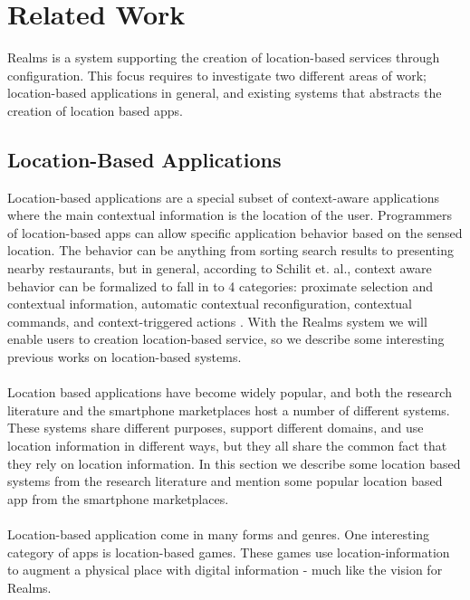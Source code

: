 \section{Related Work} %
\label{sec:related_work}
Realms is a system supporting the creation of location-based services through configuration. This focus requires to investigate two different areas of work; location-based applications in general, and existing systems that abstracts the creation of location based apps.

\subsection{Location-Based Applications} %
\label{sub:agumented_spaces}
Location-based applications are a special subset of context-aware applications where the main contextual information is the location of the user. Programmers of location-based apps can allow specific application behavior based on the sensed location. The behavior can be anything from sorting search results to presenting nearby restaurants, but in general, according to Schilit et. al., context aware behavior can be formalized to fall in to 4 categories: proximate selection and contextual information, automatic contextual reconfiguration, contextual commands, and context-triggered actions \cite{512740}. With the Realms system we will enable users to creation location-based service, so we describe some interesting previous works on location-based systems.
\\\\
Location based applications have become widely popular, and both the research literature and the smartphone marketplaces host a number of different systems. These systems share different purposes, support different domains, and use location information in different ways, but they all share the common fact that they rely on location information. In this section we describe some location based systems from the research literature and mention some popular location based app from the smartphone marketplaces.
\\\\
Location-based application come in many forms and genres. One interesting category of apps is location-based games. These games use location-information to augment a physical place with digital information - much like the vision for Realms. 
\\\\
